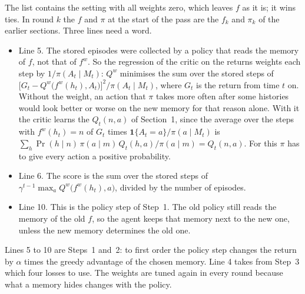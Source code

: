 \documentclass[11pt]{article}
\theoremstyle{definition}
\begin{document}
The list contains the setting with all weights zero, which leaves $f$ as it is; it wins ties. In round $k$ the $f$ and $\pi$ at the start of the pass are the $f_k$ and $\pi_k$ of the earlier sections. Three lines need a word.
\begin{itemize}\setlength{\itemsep}{0pt}
\item Line 5. The stored episodes were collected by a policy that reads the memory of $f$, not that of $f^w$. So the regression of the critic on the returns weights each step by $1/\pi(A_t\mid M_t)$: $Q^w$ minimises the sum over the stored steps of $\big[G_t-Q^w\big(f^w(h_t),A_t\big)\big]^2\big/\pi(A_t\mid M_t)$, where $G_t$ is the return from time $t$ on. Without the weight, an action that $\pi$ takes more often after some histories would look better or worse on the new memory for that reason alone. With it the critic learns the $Q_t(n,a)$ of Section~1, since the average over the steps with $f^w(h_t)=n$ of $G_t$ times $\mathbf 1\{A_t=a\}/\pi(a\mid M_t)$ is $\sum_h\Pr(h\mid n)\,\pi(a\mid m)\,Q_t(h,a)/\pi(a\mid m)=Q_t(n,a)$. For this $\pi$ has to give every action a positive probability.
\item Line 6. The score is the sum over the stored steps of $\gamma^{t-1}\max_aQ^w\big(f^w(h_t),a\big)$, divided by the number of episodes.
\item Line 10. This is the policy step of Step~1. The old policy still reads the memory of the old $f$, so the agent keeps that memory next to the new one, unless the new memory determines the old one.
\end{itemize}

Lines 5 to 10 are Steps~1 and~2: to first order the policy step changes the return by $\alpha$ times the greedy advantage of the chosen memory. Line 4 takes from Step~3 which four losses to use. The weights are tuned again in every round because what a memory hides changes with the policy.
\end{document}
